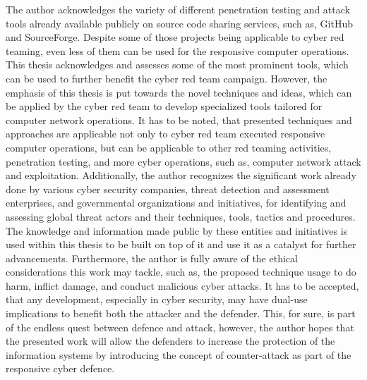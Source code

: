 The author acknowledges the variety of different penetration testing and attack tools already available publicly on source code sharing services, such as, GitHub and SourceForge. Despite some of those projects being applicable to cyber red teaming, even less of them can be used for the responsive computer operations. This thesis acknowledges and assesses some of the most prominent tools, which can be used to further benefit the cyber red team campaign. However, the emphasis of this thesis is put towards the novel techniques and ideas, which can be applied by the cyber red team to develop specialized tools tailored for computer network operations. It has to be noted, that presented techniques and approaches are applicable not only to cyber red team executed responsive computer operations, but can be applicable to other red teaming activities, penetration testing, and more cyber operations, such as, computer network attack and exploitation.
Additionally, the author recognizes the significant work already done by various cyber security companies, threat detection and assessment enterprises, and governmental organizations and initiatives, for identifying and assessing global threat actors and their techniques, tools, tactics and procedures. The knowledge and information made public by these entities and initiatives is used within this thesis to be built on top of it and use it as a catalyst for further advancements.
Furthermore, the author is fully aware of the ethical considerations this work may tackle, such as, the proposed technique usage to do harm, inflict damage, and conduct malicious cyber attacks. It has to be accepted, that any development, especially in cyber security, may have dual-use implications to benefit both the attacker and the defender. This, for sure, is part of the endless quest between defence and attack, however, the author hopes that the presented work will allow the defenders to increase the protection of the information systems by introducing the concept of counter-attack as part of the responsive cyber defence.


